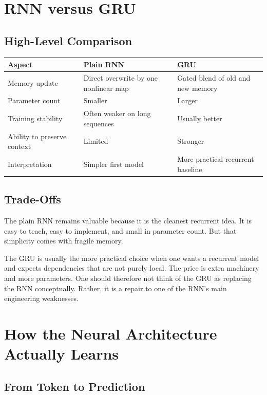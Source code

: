 \documentclass[12pt,a4paper]{article}
\begin{document}
\section{RNN versus GRU}

\subsection{High-Level Comparison}

\begin{center}
\begin{tabular}{p{3.2cm}p{5.1cm}p{5.1cm}}
\toprule
Aspect & Plain RNN & GRU \\
\midrule
Memory update & Direct overwrite by one nonlinear map & Gated blend of old and new memory \\
Parameter count & Smaller & Larger \\
Training stability & Often weaker on long sequences & Usually better \\
Ability to preserve context & Limited & Stronger \\
Interpretation & Simpler first model & More practical recurrent baseline \\
\bottomrule
\end{tabular}
\end{center}

\subsection{Trade-Offs}

The plain RNN remains valuable because it is the cleanest recurrent idea. It is easy to teach, easy to implement, and small in parameter count. But that simplicity comes with fragile memory.

The GRU is usually the more practical choice when one wants a recurrent model and expects dependencies that are not purely local. The price is extra machinery and more parameters. One should therefore not think of the GRU as replacing the RNN conceptually. Rather, it is a repair to one of the RNN's main engineering weaknesses.

\section{How the Neural Architecture Actually Learns}

\subsection{From Token to Prediction}
\end{document}
